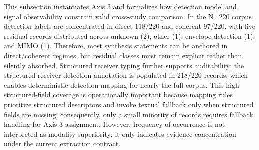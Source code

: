 {}\markdownRendererThematicBreak{}\markdownRendererInterblockSeparator
{}
\markdownRendererSectionEnd 
\markdownRendererSectionEnd \markdownRendererSectionBegin
{}\markdownRendererInterblockSeparator
{}This subsection instantiates Axis 3 and formalizes how detection model and signal observability constrain valid cross-study comparison. In the N=220 corpus, detection labels are concentrated in direct 118/220 and coherent 97/220, with five residual records distributed across unknown (2), other (1), envelope detection (1), and MIMO (1). Therefore, most synthesis statements can be anchored in direct/coherent regimes, but residual classes must remain explicit rather than silently absorbed. Structured receiver typing further supports auditability: the structured receiver-detection annotation is populated in 218/220 records, which enables deterministic detection mapping for nearly the full corpus. This high structured-field coverage is operationally important because mapping rules prioritize structured descriptors and invoke textual fallback only when structured fields are missing; consequently, only a small minority of records requires fallback handling for Axis 3 assignment. However, frequency of occurrence is not interpreted as modality superiority; it only indicates evidence concentration under the current extraction contract.\markdownRendererParagraphSeparator
{}\markdownRendererInterblockSeparator
